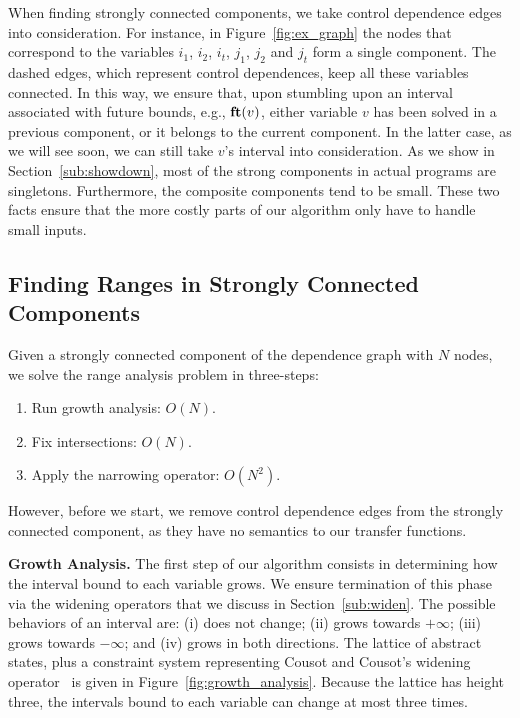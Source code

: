 \documentclass[times]{speauth}
\newcommand{\fun}[1]{\mbox{\textbf{#1}}}
\begin{document}
When finding strongly connected components, we take control dependence
edges into consideration.
For instance, in Figure~\ref{fig:ex_graph} the nodes that correspond to the
variables $i_1$, $i_2$, $i_t$, $j_1$, $j_2$ and $j_t$ form a single component.
The dashed edges, which represent control dependences, keep all these variables
connected.
In this way, we ensure that, upon stumbling upon an interval associated with
future bounds, e.g., $\fun{ft}(v)$, either variable $v$ has been solved in a
previous component, or it belongs to the current component.
In the latter case, as we will see soon, we can still take $v$'s interval into
consideration.
As we show in Section~\ref{sub:showdown}, most of the strong components in
actual programs are singletons.
Furthermore, the composite components tend to be small.
These two facts ensure that the more costly parts of our algorithm only have to
handle small inputs.

\subsection{Finding Ranges in Strongly Connected Components}
\label{sub:micro}

Given a strongly connected component of the dependence graph with $N$ nodes,
we solve the range analysis problem in three-steps:
\begin{enumerate}
\item Run growth analysis: $O(N)$.

\item Fix intersections: $O(N)$.

\item Apply the narrowing operator: $O(N^2)$.

\end{enumerate}
However, before we start, we remove control dependence edges from the
strongly connected component, as they have no semantics to our transfer
functions.

\noindent
\textbf{Growth Analysis.}
The first step of our algorithm consists in determining how the interval bound
to each variable grows.
We ensure termination of this phase via the widening operators that we
discuss in Section~\ref{sub:widen}.
The possible behaviors of an interval are:
(i) does not change;
(ii) grows towards $+\infty$;
(iii) grows towards $-\infty$; and
(iv) grows in both directions.
The lattice of abstract states, plus a constraint system representing
Cousot and Cousot's widening operator~\cite[p.247]{Cousot77} is given in
Figure~\ref{fig:growth_analysis}.
Because the lattice has height three, the intervals bound to each variable can
change at most three times.
\end{document}
